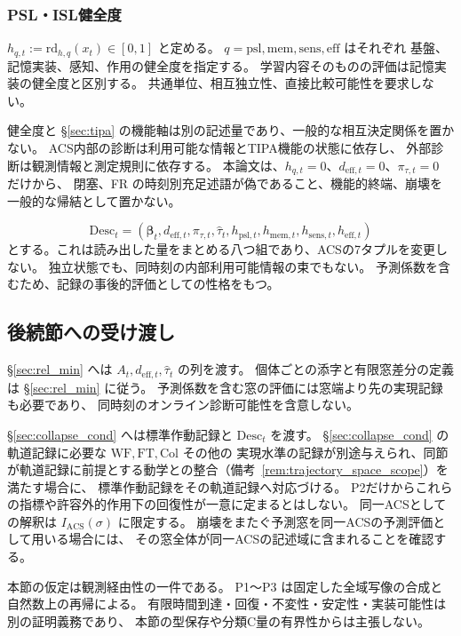 \subsubsection{PSL・ISL健全度}
\label{subsec:health_dyn}
\begin{definition}
\label{def:s5_health_quantities}
$h_{q,t}:=\mathrm{rd}_{h,q}(x_t)\in[0,1]$ と定める。
$q=\mathrm{psl},\mathrm{mem},\mathrm{sens},\mathrm{eff}$ はそれぞれ
基盤、記憶実装、感知、作用の健全度を指定する。
学習内容そのものの評価は記憶実装の健全度と区別する。
共通単位、相互独立性、直接比較可能性を要求しない。
\end{definition}

\begin{remark}
\label{rem:s5_health_noncollapse}
健全度と \S\ref{sec:tipa} の機能軸は別の記述量であり、一般的な相互決定関係を置かない。
ACS内部の診断は利用可能な情報とTIPA機能の状態に依存し、
外部診断は観測情報と測定規則に依存する。
本論文は、$h_{q,t}=0$、$d_{\mathrm{eff},t}=0$、$\pi_{\tau,t}=0$ だけから、
閉塞、FR の時刻別充足述語が偽であること、機能的終端、崩壊を一般的な帰結として置かない。
\end{remark}

\begin{definition}
\label{def:extended_variable_tuple}
\label{subsubsec:desc_tuple}
\[
\mathrm{Desc}_t=(\boldsymbol\beta_t,d_{\mathrm{eff},t},\pi_{\tau,t},\widehat\tau_t,
 h_{\mathrm{psl},t},h_{\mathrm{mem},t},h_{\mathrm{sens},t},h_{\mathrm{eff},t})
\]
とする。これは読み出した量をまとめる八つ組であり、ACSの7タプルを変更しない。
独立状態でも、同時刻の内部利用可能情報の束でもない。
予測係数を含むため、記録の事後的評価としての性格をもつ。
\end{definition}

\subsection{後続節への受け渡し}
\label{subsec:s5_summary}
\label{subsubsec:s5_deff_interface}
\begin{definition}[後続節への記録インターフェース]
\label{def:s5_downstream_interface}
\S\ref{sec:rel_min} へは $A_t,d_{\mathrm{eff},t},\widehat\tau_t$ の列を渡す。
個体ごとの添字と有限窓差分の定義は \S\ref{sec:rel_min} に従う。
予測係数を含む窓の評価には窓端より先の実現記録も必要であり、
同時刻のオンライン診断可能性を含意しない。

\S\ref{sec:collapse_cond} へは標準作動記録と $\mathrm{Desc}_t$ を渡す。
\S\ref{sec:collapse_cond} の軌道記録に必要な $\mathrm{WF},\mathrm{FT},\mathrm{Col}$ その他の
実現水準の記録が別途与えられ、同節が軌道記録に前提とする動学との整合（備考~\ref{rem:trajectory_space_scope}）を満たす場合に、
標準作動記録をその軌道記録へ対応づける。
P2だけからこれらの指標や許容外的作用下の回復性が一意に定まるとはしない。
同一ACSとしての解釈は $I_{\mathrm{ACS}}(\sigma)$ に限定する。
崩壊をまたぐ予測窓を同一ACSの予測評価として用いる場合には、
その窓全体が同一ACSの記述域に含まれることを確認する。
\end{definition}

本節の仮定は観測経由性の一件である。
P1〜P3 は固定した全域写像の合成と自然数上の再帰による。
有限時間到達・回復・不変性・安定性・実装可能性は別の証明義務であり、
本節の型保存や分類C量の有界性からは主張しない。

